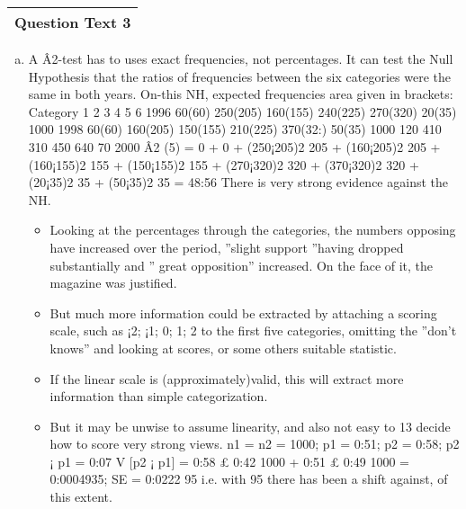 \documentclass[a4paper,12pt]{article}
\begin{document}
  \begin{table}[ht!]
 \centering
 \begin{tabular}{|p{15cm}|}
 \hline  
Question Text 3 
\\ \hline
  \end{tabular}
\end{table}\begin{enumerate}[(a)]
\item A Â2-test has to uses exact frequencies, not percentages. It can test the Null Hypothesis
that the ratios of frequencies between the six categories were the same in both years. On-this
NH, expected frequencies area given in brackets:
Category 1 2 3 4 5 6
1996 60(60) 250(205) 160(155) 240(225) 270(320) 20(35) 1000
1998 60(60) 160(205) 150(155) 210(225) 370(32:) 50(35) 1000
120 410 310 450 640 70 2000
Â2
(5) = 0 + 0 + (250¡205)2
205 + (160¡205)2
205 + (160¡155)2
155 + (150¡155)2
155 + (270¡320)2
320 + (370¡320)2
320 +
(20¡35)2
35 + (50¡35)2
35 = 48:56
There is very strong evidence against the NH.

\begin{itemize}
\item Looking at the percentages through the categories, the numbers opposing have increased over
the period, ”slight support ”having dropped substantially and ” great opposition” increased.
On the face of it, the magazine was justified.
\item But much more information could be extracted by attaching a scoring scale, such as ¡2; ¡1; 0;
1; 2 to the first five categories, omitting the ”don’t knows” and looking at scores, or some others
suitable statistic. 
\item If the linear scale is (approximately)valid, this will extract more information
than simple categorization. 
\item But it may be unwise to assume linearity, and also not easy to
13
decide how to score very strong views.
n1 = n2 = 1000; p1 = 0:51; p2 = 0:58; p2 ¡ p1 = 0:07
V [p2 ¡ p1] =
0:58 £ 0:42
1000
+
0:51 £ 0:49
1000
= 0:0004935; SE = 0:0222
95%
i.e. with 95%
there has been a shift against, of this extent.
\end{itemize}
\end{enumerate}
\end{document}
